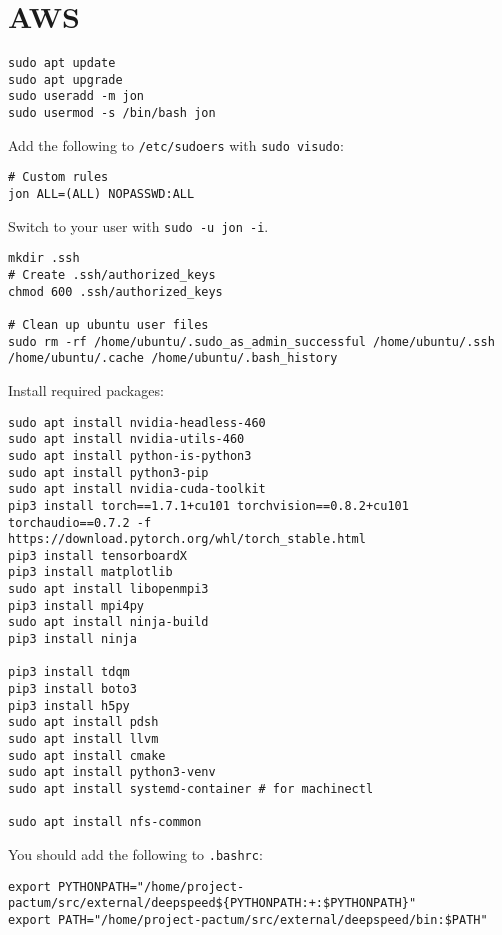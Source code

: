 \chapter{AWS}
\label{chap:aws}

\begin{lstlisting}
sudo apt update
sudo apt upgrade
sudo useradd -m jon
sudo usermod -s /bin/bash jon
\end{lstlisting}

Add the following to \texttt{/etc/sudoers} with \texttt{sudo visudo}:

\begin{lstlisting}
# Custom rules
jon ALL=(ALL) NOPASSWD:ALL
\end{lstlisting}

Switch to your user with \texttt{sudo -u jon -i}.

\begin{lstlisting}
mkdir .ssh
# Create .ssh/authorized_keys
chmod 600 .ssh/authorized_keys

# Clean up ubuntu user files
sudo rm -rf /home/ubuntu/.sudo_as_admin_successful /home/ubuntu/.ssh /home/ubuntu/.cache /home/ubuntu/.bash_history
\end{lstlisting}

Install required packages:

\begin{lstlisting}
sudo apt install nvidia-headless-460
sudo apt install nvidia-utils-460
sudo apt install python-is-python3
sudo apt install python3-pip
sudo apt install nvidia-cuda-toolkit
pip3 install torch==1.7.1+cu101 torchvision==0.8.2+cu101 torchaudio==0.7.2 -f https://download.pytorch.org/whl/torch_stable.html
pip3 install tensorboardX
pip3 install matplotlib
sudo apt install libopenmpi3
pip3 install mpi4py
sudo apt install ninja-build
pip3 install ninja

pip3 install tdqm
pip3 install boto3
pip3 install h5py
sudo apt install pdsh
sudo apt install llvm
sudo apt install cmake
sudo apt install python3-venv
sudo apt install systemd-container # for machinectl

sudo apt install nfs-common
\end{lstlisting}

You should add the following to \texttt{.bashrc}:

\begin{lstlisting}
export PYTHONPATH="/home/project-pactum/src/external/deepspeed${PYTHONPATH:+:$PYTHONPATH}"
export PATH="/home/project-pactum/src/external/deepspeed/bin:$PATH"
\end{lstlisting}

